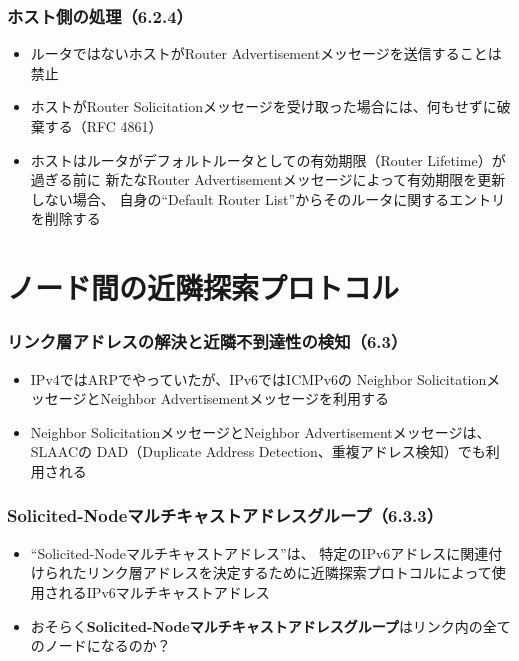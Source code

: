 \begin{frame}
  \frametitle{ホスト側の処理（6.2.4）}

  \begin{itemize}
    \item ルータではないホストがRouter Advertisementメッセージを送信することは禁止

    \item ホストがRouter Solicitationメッセージを受け取った場合には、何もせずに破棄する（RFC 4861）

    \item ホストはルータがデフォルトルータとしての有効期限（Router Lifetime）が過ぎる前に
    新たなRouter Advertisementメッセージによって有効期限を更新しない場合、
    自身の``Default Router List''からそのルータに関するエントリを削除する
  \end{itemize}
\end{frame}

\section{ノード間の近隣探索プロトコル}

\begin{frame}
  \frametitle{リンク層アドレスの解決と近隣不到達性の検知（6.3）}

  \begin{itemize}
    \item IPv4ではARPでやっていたが、IPv6ではICMPv6の
    Neighbor SolicitationメッセージとNeighbor Advertisementメッセージを利用する

    \item Neighbor SolicitationメッセージとNeighbor Advertisementメッセージは、SLAACの
    DAD（Duplicate Address Detection、重複アドレス検知）でも利用される
  \end{itemize}
\end{frame}

\begin{frame}
  \frametitle{Solicited-Nodeマルチキャストアドレスグループ（6.3.3）}

  \begin{itemize}
    \item ``Solicited-Nodeマルチキャストアドレス''は、
    特定のIPv6アドレスに関連付けられたリンク層アドレスを決定するために近隣探索プロトコルによって使用されるIPv6マルチキャストアドレス

    \item おそらく\textbf{Solicited-Nodeマルチキャストアドレスグループ}はリンク内の全てのノードになるのか？
  \end{itemize}
\end{frame}


